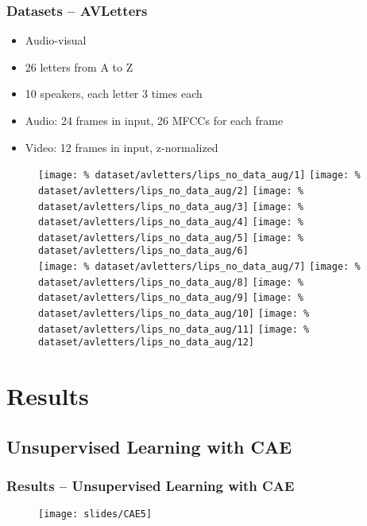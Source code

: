 \begin{frame}
\frametitle{Datasets -- AVLetters}
  \begin{itemize}
    \item Audio-visual
    \item 26 letters from A to Z
    \item 10 speakers, each letter 3 times each
    \item Audio: 24 frames in input, 26 MFCCs for each frame 
    \item Video: 12 frames in input, z-normalized
  \end{itemize}
  \begin{figure}[H]
    \centering
    \hfill
    \texttt{[image: \%
      dataset/avletters/lips\_no\_data\_aug/1]}
    \hfill
    \texttt{[image: \%
      dataset/avletters/lips\_no\_data\_aug/2]}
    \hfill
    \texttt{[image: \%
      dataset/avletters/lips\_no\_data\_aug/3]}
    \hfill
    \texttt{[image: \%
      dataset/avletters/lips\_no\_data\_aug/4]}
    \hfill
    \texttt{[image: \%
      dataset/avletters/lips\_no\_data\_aug/5]}
    \hfill
    \texttt{[image: \%
      dataset/avletters/lips\_no\_data\_aug/6]}\\[0.15em]
    \hfill
    \texttt{[image: \%
      dataset/avletters/lips\_no\_data\_aug/7]}
    \hfill
    \texttt{[image: \%
      dataset/avletters/lips\_no\_data\_aug/8]}
    \hfill
    \texttt{[image: \%
      dataset/avletters/lips\_no\_data\_aug/9]}
    \hfill
    \texttt{[image: \%
      dataset/avletters/lips\_no\_data\_aug/10]}
    \hfill
    \texttt{[image: \%
      dataset/avletters/lips\_no\_data\_aug/11]}
    \hfill
    \texttt{[image: \%
      dataset/avletters/lips\_no\_data\_aug/12]}
    \hfill
  \end{figure}
\end{frame}

\section{Results}

\subsection{Unsupervised Learning with CAE}

\begin{frame}
\frametitle{Results -- Unsupervised Learning with CAE}
  \begin{figure}
    \texttt{[image: slides/CAE5]}
  \end{figure}
\end{frame}

